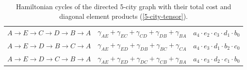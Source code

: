 \documentclass[msc,oneside]{ubcthesis}
\begin{document}
\begin{table}[h]
\begin{tabular}{|c|c|c|}
$A \rightarrow E \rightarrow C \rightarrow D \rightarrow B \rightarrow A$ & $ \gamma_{AE} + \gamma_{EC} + \gamma_{CD} + \gamma_{DB} + \gamma_{BA}$ & $a_4  \cdot e_2 \cdot c_3 \cdot d_1 \cdot b_0$ \\
$A \rightarrow E \rightarrow D \rightarrow B \rightarrow C \rightarrow A$ & $ \gamma_{AE} + \gamma_{ED} + \gamma_{DB} + \gamma_{BC} + \gamma_{CA}$ & $a_4  \cdot e_3 \cdot d_1 \cdot b_2 \cdot c_0$ \\
$A \rightarrow E \rightarrow D \rightarrow C \rightarrow B \rightarrow A$ & $ \gamma_{AE} + \gamma_{ED} + \gamma_{DC} + \gamma_{CB} + \gamma_{BA}$ & $a_4  \cdot e_3 \cdot d_2 \cdot c_1 \cdot b_0$ \\
			\hline
			\end{tabular}
\caption{Hamiltonian cycles of the directed 5-city graph with their total cost and diagonal element products (\ref{5-city-tensor}).}
\label{table:ham-cycle-details-5-city}
\end{table}
\end{document}
